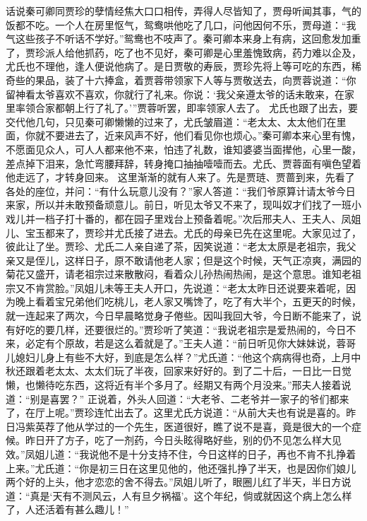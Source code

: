 \documentclass[12pt,oneside]{book}
\begin{document}
话说秦可卿同贾珍的孽情经焦大口口相传，弄得人尽皆知了，贾母听闻其事，气的饭都不吃。一个人在房里怄气，鸳鸯哄他吃了几口，问他因何不乐，贾母道：“我气这些孩子不听话不学好。”鸳鸯也不吱声了。秦可卿本来身上有病，这回愈发加重了，贾珍派人给他抓药，吃了也不见好，秦可卿是心里羞愧致病，药力难以企及，尤氏也不理他，逢人便说他病了。是日贾敬的寿辰，贾珍先将上等可吃的东西，稀奇些的果品，装了十六捧盒，着贾蓉带领家下人等与贾敬送去，向贾蓉说道：“你留神看太爷喜欢不喜欢，你就行了礼来。你说：‘我父亲遵太爷的话未敢来，在家里率领合家都朝上行了礼了。’”贾蓉听罢，即率领家人去了。
尤氏也跟了出去，要交代他几句，只见秦可卿懒懒的过来了，尤氏皱眉道：“老太太、太太他们在里面，你就不要进去了，近来风声不好，他们看见你也烦心。”秦可卿本来心里有愧，不愿面见众人，可人人都来他不来，怕违了礼数，谁知婆婆当面撵他，心里一酸，差点掉下泪来，急忙弯腰拜辞，转身掩口抽抽噎噎而去。尤氏、贾蓉面有嗔色望着他走远了，才转身回来。 
这里渐渐的就有人来了。先是贾琏、贾蔷到来，先看了各处的座位，并问：“有什么玩意儿没有？”家人答道：“我们爷原算计请太爷今日来家，所以并未敢预备顽意儿。前日，听见太爷又不来了，现叫奴才们找了一班小戏儿并一档子打十番的，都在园子里戏台上预备着呢。”次后邢夫人、王夫人、凤姐儿、宝玉都来了，贾珍并尤氏接了进去。尤氏的母亲已先在这里呢。大家见过了，彼此让了坐。贾珍、尤氏二人亲自递了茶，因笑说道：“老太太原是老祖宗，我父亲又是侄儿，这样日子，原不敢请他老人家；但是这个时候，天气正凉爽，满园的菊花又盛开，请老祖宗过来散散闷，看着众儿孙热闹热闹，是这个意思。谁知老祖宗又不肯赏脸。”凤姐儿未等王夫人开口，先说道：“老太太昨日还说要来着呢，因为晚上看着宝兄弟他们吃桃儿，老人家又嘴馋了，吃了有大半个，五更天的时候，就一连起来了两次，今日早晨略觉身子倦些。因叫我回大爷，今日断不能来了，说有好吃的要几样，还要很烂的。”贾珍听了笑道：“我说老祖宗是爱热闹的，今日不来，必定有个原故，若是这么着就是了。”王夫人道：“前日听见你大妹妹说，蓉哥儿媳妇儿身上有些不大好，到底是怎么样？”尤氏道：“他这个病病得也奇，上月中秋还跟着老太太、太太们玩了半夜，回家来好好的。到了二十后，一日比一日觉懒，也懒待吃东西，这将近有半个多月了。经期又有两个月没来。”邢夫人接着说道：“别是喜罢？”
正说着，外头人回道：“大老爷、二老爷并一家子的爷们都来了，在厅上呢。”贾珍连忙出去了。这里尤氏方说道：“从前大夫也有说是喜的。昨日冯紫英荐了他从学过的一个先生，医道很好，瞧了说不是喜，竟是很大的一个症候。昨日开了方子，吃了一剂药，今日头眩得略好些，别的仍不见怎么样大见效。”凤姐儿道：“我说他不是十分支持不住，今日这样的日子，再也不肯不扎挣着上来。”尤氏道：“你是初三日在这里见他的，他还强扎挣了半天，也是因你们娘儿两个好的上头，他才恋恋的舍不得去。”凤姐儿听了，眼圈儿红了半天，半日方说道：“真是‘天有不测风云，人有旦夕祸福’。这个年纪，倘或就因这个病上怎么样了，人还活着有甚么趣儿！”
\end{document}
